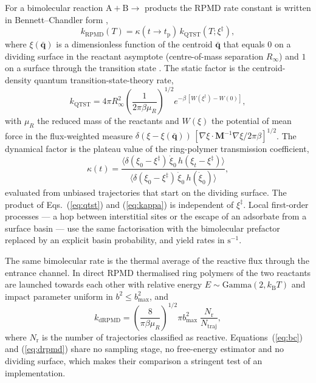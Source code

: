 \documentclass[preprint,12pt]{elsarticle}
\newcounter{bla}
\newcommand{\kB}{k_{\mathrm{B}}}
\begin{document}
For a bimolecular reaction $\mathrm A+\mathrm B\to$ products the RPMD rate constant is written in Bennett--Chandler form \cite{bimol09},
\begin{equation}
k_{\mathrm{RPMD}}(T)=\kappa(t\to t_{\mathrm p})\,k_{\mathrm{QTST}}(T;\xi^{\ddagger}),
\label{eq:bc}
\end{equation}
where $\xi(\bar{\mathbf q})$ is a dimensionless function of the centroid $\bar{\mathbf q}$ that equals $0$ on a dividing surface in the reactant asymptote (centre-of-mass separation $R_\infty$) and $1$ on a surface through the transition state \cite{rpmrate13}. The static factor is the centroid-density quantum transition-state-theory rate,
\begin{equation}
k_{\mathrm{QTST}}=4\pi R_\infty^{2}\left(\frac{1}{2\pi\beta\mu_R}\right)^{1/2}
e^{-\beta\,[W(\xi^{\ddagger})-W(0)]},
\label{eq:qtst}
\end{equation}
with $\mu_R$ the reduced mass of the reactants and $W(\xi)$ the potential of mean force in the flux-weighted measure $\delta(\xi-\xi(\bar{\mathbf q}))\,[\nabla\xi\cdot\mathbf M^{-1}\nabla\xi/2\pi\beta]^{1/2}$. The dynamical factor is the plateau value of the ring-polymer transmission coefficient,
\begin{equation}
\kappa(t)=\frac{\langle \delta(\xi_0-\xi^{\ddagger})\,\dot\xi_0\,h(\xi_t-\xi^{\ddagger})\rangle}
{\langle \delta(\xi_0-\xi^{\ddagger})\,\dot\xi_0\,h(\dot\xi_0)\rangle},
\label{eq:kappa}
\end{equation}
evaluated from unbiased trajectories that start on the dividing surface. The product of Eqs.~(\ref{eq:qtst}) and (\ref{eq:kappa}) is independent of $\xi^{\ddagger}$. Local first-order processes --- a hop between interstitial sites or the escape of an adsorbate from a surface basin --- use the same factorisation with the bimolecular prefactor replaced by an explicit basin probability, and yield rates in $\mathrm s^{-1}$.

The same bimolecular rate is the thermal average of the reactive flux through the entrance channel. In direct RPMD \cite{drpmd18} thermalised ring polymers of the two reactants are launched towards each other with relative energy $E\sim\mathrm{Gamma}(2,\kB T)$ and impact parameter uniform in $b^{2}\le b_{\max}^{2}$, and
\begin{equation}
k_{\mathrm{dRPMD}}=\left(\frac{8}{\pi\beta\mu_R}\right)^{1/2}\pi b_{\max}^{2}\;\frac{N_{\mathrm r}}{N_{\mathrm{traj}}},
\label{eq:drpmd}
\end{equation}
where $N_{\mathrm r}$ is the number of trajectories classified as reactive. Equations~(\ref{eq:bc}) and (\ref{eq:drpmd}) share no sampling stage, no free-energy estimator and no dividing surface, which makes their comparison a stringent test of an implementation.
\end{document}
